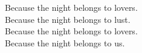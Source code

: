 Because the night belongs to lovers. \\
Because the night belongs to lust. \\
Because the night belongs to lovers. \\
Because the night belongs to us. \\


